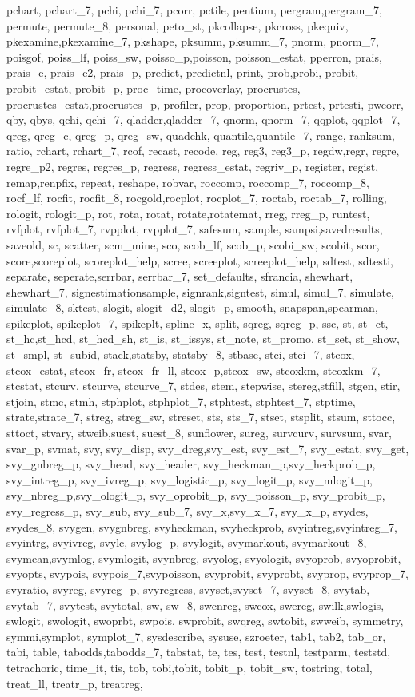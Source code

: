 {{pchart, pchart_7, pchi, pchi_7, pcorr, pctile, pentium, pergram,pergram_7, permute, permute_8, personal, peto_st, pkcollapse, pkcross, pkequiv, pkexamine,pkexamine_7, pkshape, pksumm, pksumm_7, pnorm, pnorm_7, poisgof, poiss_lf, poiss_sw, poisso_p,poisson, poisson_estat, pperron, prais, prais_e, prais_e2, prais_p, predict, predictnl, print, prob,probi, probit, probit_estat, probit_p, proc_time, procoverlay, procrustes, procrustes_estat,procrustes_p, profiler, prop, proportion, prtest, prtesti, pwcorr, qby, qbys, qchi, qchi_7, qladder,qladder_7, qnorm, qnorm_7, qqplot, qqplot_7, qreg, qreg_c, qreg_p, qreg_sw, quadchk, quantile,quantile_7, range, ranksum, ratio, rchart, rchart_7, rcof, recast, recode, reg, reg3, reg3_p, regdw,regr, regre, regre_p2, regres, regres_p, regress, regress_estat, regriv_p, register, regist, remap,renpfix, repeat, reshape, robvar, roccomp, roccomp_7, roccomp_8, rocf_lf, rocfit, rocfit_8, rocgold,rocplot, rocplot_7, roctab, roctab_7, rolling, rologit, rologit_p, rot, rota, rotat, rotate,rotatemat, rreg, rreg_p, runtest, rvfplot, rvfplot_7, rvpplot, rvpplot_7, safesum, sample, sampsi,savedresults, saveold, sc, scatter, scm_mine, sco, scob_lf, scob_p, scobi_sw, scobit, scor, score,scoreplot, scoreplot_help, scree, screeplot, screeplot_help, sdtest, sdtesti, separate, seperate,serrbar, serrbar_7, set_defaults, sfrancia, shewhart, shewhart_7, signestimationsample, signrank,signtest, simul, simul_7, simulate, simulate_8, sktest, slogit, slogit_d2, slogit_p, smooth, snapspan,spearman, spikeplot, spikeplot_7, spikeplt, spline_x, split, sqreg, sqreg_p, ssc, st, st_ct, st_hc,st_hcd, st_hcd_sh, st_is, st_issys, st_note, st_promo, st_set, st_show, st_smpl, st_subid, stack,statsby, statsby_8, stbase, stci, stci_7, stcox, stcox_estat, stcox_fr, stcox_fr_ll, stcox_p,stcox_sw, stcoxkm, stcoxkm_7, stcstat, stcurv, stcurve, stcurve_7, stdes, stem, stepwise, stereg,stfill, stgen, stir, stjoin, stmc, stmh, stphplot, stphplot_7, stphtest, stphtest_7, stptime, strate,strate_7, streg, streg_sw, streset, sts, sts_7, stset, stsplit, stsum, sttocc, sttoct, stvary, stweib,suest, suest_8, sunflower, sureg, survcurv, survsum, svar, svar_p, svmat, svy, svy_disp, svy_dreg,svy_est, svy_est_7, svy_estat, svy_get, svy_gnbreg_p, svy_head, svy_header, svy_heckman_p,svy_heckprob_p, svy_intreg_p, svy_ivreg_p, svy_logistic_p, svy_logit_p, svy_mlogit_p, svy_nbreg_p,svy_ologit_p, svy_oprobit_p, svy_poisson_p, svy_probit_p, svy_regress_p, svy_sub, svy_sub_7, svy_x,svy_x_7, svy_x_p, svydes, svydes_8, svygen, svygnbreg, svyheckman, svyheckprob, svyintreg,svyintreg_7, svyintrg, svyivreg, svylc, svylog_p, svylogit, svymarkout, svymarkout_8, svymean,svymlog, svymlogit, svynbreg, svyolog, svyologit, svyoprob, svyoprobit, svyopts, svypois, svypois_7,svypoisson, svyprobit, svyprobt, svyprop, svyprop_7, svyratio, svyreg, svyreg_p, svyregress, svyset,svyset_7, svyset_8, svytab, svytab_7, svytest, svytotal, sw, sw_8, swcnreg, swcox, swereg, swilk,swlogis, swlogit, swologit, swoprbt, swpois, swprobit, swqreg, swtobit, swweib, symmetry, symmi,symplot, symplot_7, sysdescribe, sysuse, szroeter, tab1, tab2, tab_or, tabi, table, tabodds,tabodds_7, tabstat, te, tes, test, testnl, testparm, teststd, tetrachoric, time_it, tis, tob, tobi,tobit, tobit_p, tobit_sw, tostring, total, treat_ll, treatr_p, treatreg, }}
